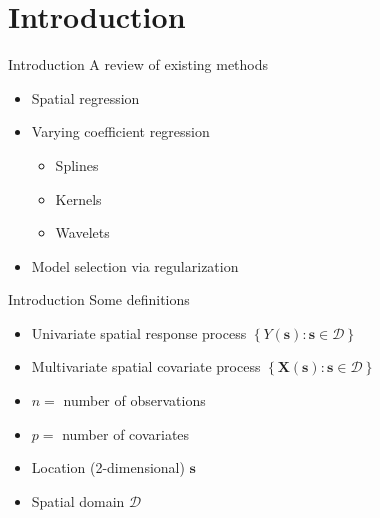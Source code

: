 \documentclass[12pt,t]{beamer}
\newcommand{\subt}[1]{{\footnotesize \color{subtitle} {#1}}}
\begin{document}
\section{Introduction}



\begin{frame}{Introduction}
\subt{A review of existing methods}

\bigskip
\begin{itemize}
    \item Spatial regression
    \item Varying coefficient regression
    \begin{itemize}
        \item Splines
        \item Kernels
        \item Wavelets
    \end{itemize}
    \item Model selection via regularization
\end{itemize}

\end{frame}






\begin{frame}{Introduction}
\subt{Some definitions}

\bigskip
\begin{itemize}
    \item Univariate spatial response process $\left\{ Y(\bm{s}) : \bm{s} \in \mathcal{D} \right\}$
    \item Multivariate spatial covariate process $\left\{ \bm{X}(\bm{s}) : \bm{s} \in \mathcal{D} \right\}$
    \item $n = $ number of observations
    \item $p = $ number of covariates
    \item Location (2-dimensional) $\bm{s}$
    \item Spatial domain $\mathcal{D}$
\end{itemize}


\end{frame}
\end{document}
